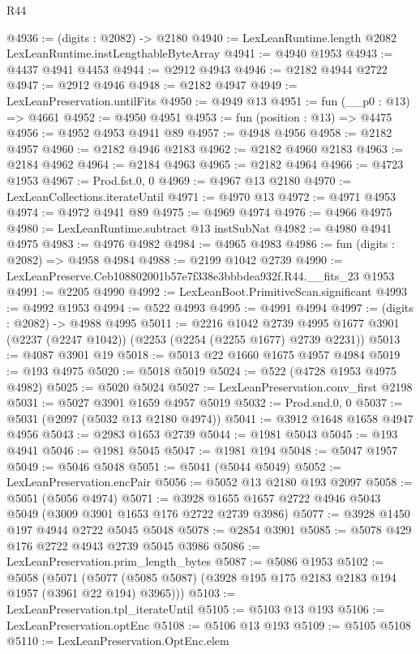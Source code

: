 \begin{lexlean}{R44}
\begin{coremodule}
@4936 := (digits : @2082) -> @2180
@4940 := LexLeanRuntime.length @2082 LexLeanRuntime.instLengthableByteArray
@4941 := @4940 @1953
@4943 := @4437 @4941 @4453
@4944 := @2912 @4943
@4946 := @2182 @4944 @2722
@4947 := @2912 @4946
@4948 := @2182 @4947
@4949 := LexLeanPreservation.untilFits
@4950 := @4949 @13
@4951 := fun (__p0 : @13) => @4661
@4952 := @4950 @4951
@4953 := fun (position : @13) => @4475
@4956 := @4952 @4953 @4941 @89
@4957 := @4948 @4956
@4958 := @2182 @4957
@4960 := @2182 @4946 @2183
@4962 := @2182 @4960 @2183
@4963 := @2184 @4962
@4964 := @2184 @4963
@4965 := @2182 @4964
@4966 := @4723 @1953
@4967 := Prod.fst.{0, 0}
@4969 := @4967 @13 @2180
@4970 := LexLeanCollections.iterateUntil
@4971 := @4970 @13
@4972 := @4971 @4953
@4974 := @4972 @4941 @89
@4975 := @4969 @4974
@4976 := @4966 @4975
@4980 := LexLeanRuntime.subtract @13 instSubNat
@4982 := @4980 @4941 @4975
@4983 := @4976 @4982
@4984 := @4965 @4983
@4986 := fun (digits : @2082) => @4958 @4984
@4988 := @2199 @1042 @2739
@4990 := LexLeanPreserve.Ceb108802001b57e7f338e3bbbdea932f.R44.__fits_23 @1953
@4991 := @2205 @4990
@4992 := LexLeanBoot.PrimitiveScan.significant
@4993 := @4992 @1953
@4994 := @522 @4993
@4995 := @4991 @4994
@4997 := (digits : @2082) -> @4988 @4995
@5011 := @2216
    @1042
    @2739
    @4995
    @1677
    @3901
    (@2237 (@2247 @1042))
    (@2253 (@2254 (@2255 @1677) @2739 @2231))
@5013 := @4087 @3901 @19
@5018 := @5013 @22 @1660 @1675 @4957 @4984
@5019 := @193 @4975
@5020 := @5018 @5019
@5024 := @522 (@4728 @1953 @4975 @4982)
@5025 := @5020 @5024
@5027 := LexLeanPreservation.conv_first @2198
@5031 := @5027 @3901 @1659 @4957 @5019
@5032 := Prod.snd.{0, 0}
@5037 := @5031 (@2097 (@5032 @13 @2180 @4974))
@5041 := @3912 @1648 @1658 @4947 @4956
@5043 := @2983 @1653 @2739
@5044 := @1981 @5043
@5045 := @193 @4941
@5046 := @1981 @5045
@5047 := @1981 @194
@5048 := @5047 @1957
@5049 := @5046 @5048
@5051 := @5041 (@5044 @5049)
@5052 := LexLeanPreservation.encPair
@5056 := @5052 @13 @2180 @193 @2097
@5058 := @5051 (@5056 @4974)
@5071 := @3928 @1655 @1657 @2722 @4946 @5043 @5049 (@3009 @3901 @1653 @176 @2722 @2739 @3986)
@5077 := @3928 @1450 @197 @4944 @2722 @5045 @5048
@5078 := @2854 @3901
@5085 := @5078 @429 @176 @2722 @4943 @2739 @5045 @3986
@5086 := LexLeanPreservation.prim_length_bytes
@5087 := @5086 @1953
@5102 := @5058
    (@5071 (@5077 (@5085 @5087) (@3928 @195 @175 @2183 @2183 @194 @1957 (@3961 @22 @194) @3965)))
@5103 := LexLeanPreservation.tpl_iterateUntil
@5105 := @5103 @13 @193
@5106 := LexLeanPreservation.optEnc
@5108 := @5106 @13 @193
@5109 := @5105 @5108
@5110 := LexLeanPreservation.OptEnc.elem

\end{coremodule}
\end{lexlean}
